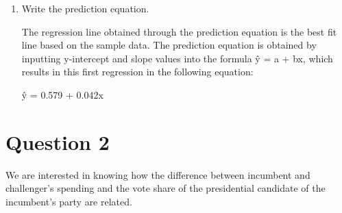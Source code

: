 \documentclass[12pt,letterpaper]{article}
\begin{document}
\begin{enumerate}
		\item Write the prediction equation.
		\vspace{.5cm}
		
			The regression line obtained through the prediction equation is the best fit line based on the sample data. The prediction equation is obtained by inputting y-intercept and slope values into the formula \^{y} = a + bx, which results in this first regression in the following equation:
		\vspace{.25cm}
		
		 \^{y} = 0.579 + 0.042x \centering
	\end{enumerate}
	
\vspace{.25cm}
\section*{Question 2}
\noindent We are interested in knowing how the difference between incumbent and challenger's spending and the vote share of the presidential candidate of the incumbent's party are related.	\vspace{.25cm}
\end{document}
